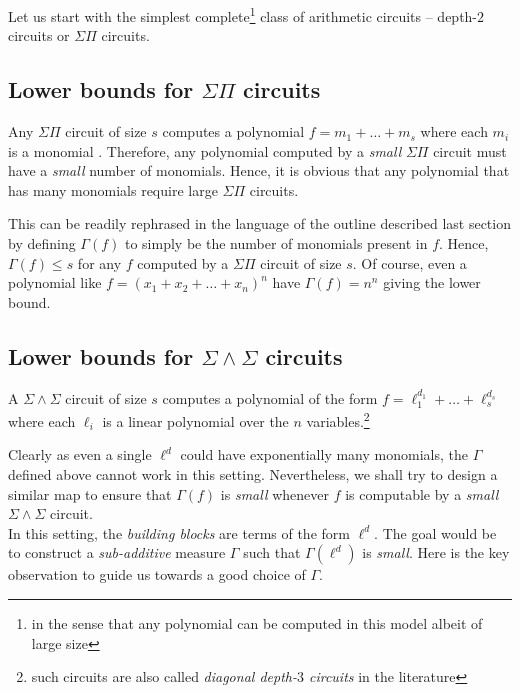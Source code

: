 \documentclass{birkjour}
\providecommand{\DIFaddtex}[1]{{\protect\color{blue}\uwave{#1}}} %
\providecommand{\DIFdeltex}[1]{{\protect\color{red}\sout{#1}}}                      %
\providecommand{\DIFaddbegin}{} %
\providecommand{\DIFaddend}{} %
\providecommand{\DIFdelbegin}{} %
\providecommand{\DIFdelend}{} %
\providecommand{\DIFadd}[1]{\texorpdfstring{\DIFaddtex{#1}}{#1}} %
\providecommand{\DIFdel}[1]{\texorpdfstring{\DIFdeltex{#1}}{}} %
\begin{document}
Let us start with the simplest complete\footnote{in the sense that any polynomial can be computed in this model albeit of large size}  class of arithmetic circuits -- depth-$2$ circuits or $\Sigma\Pi$ circuits. 

\subsection{Lower bounds for $\Sigma\Pi$ circuits}

Any $\Sigma\Pi$ circuit of size $s$ computes a polynomial $f = m_1 + \dots + m_s$ where each $m_i$ is a monomial \DIFaddbegin \DIFadd{multiplied by a field constant}\DIFaddend . Therefore, any polynomial computed by a \emph{small} $\Sigma\Pi$ circuit must have a \emph{small} number of monomials. Hence, it is obvious that any polynomial that has many monomials require large $\Sigma\Pi$ circuits. 

This can be readily rephrased in the language of the outline described last section by defining $\Gamma(f)$ to simply be the number of monomials present in $f$. Hence, $\Gamma(f)\leq s$ for any $f$ computed by a $\Sigma\Pi$ circuit of size $s$. Of course, even a polynomial like $f = (x_1 + x_2+\dots + x_n)^n$  have \DIFdelbegin \DIFdel{$\Gamma(f) = n^n$ }\DIFdelend \DIFaddbegin \DIFadd{$\Gamma(f) = n^{\Omega(n)}$ }\DIFaddend giving the lower bound. 

\subsection{Lower bounds for $\Sigma\!\wedge\!\Sigma$ circuits}

A $\Sigma\!\wedge\!\Sigma$ circuit of size $s$ computes a polynomial of the form $f = \ell_1^{d_1} + \dots + \ell_s^{d_s}$ where each $\ell_i$ is a linear polynomial over the $n$ variables.\footnote{such circuits are also called \emph{diagonal depth-$3$ circuits} in the literature}

Clearly as even a single $\ell^d$ could have exponentially many monomials, the $\Gamma$ defined above cannot work in this setting. Nevertheless, we shall try to design a similar map to ensure that $\Gamma(f)$ is \emph{small} whenever $f$ is computable by a \emph{small} $\Sigma\!\wedge\!\Sigma$ circuit. \\

In this setting, the \emph{building blocks} are terms of the form $\ell^d$. The goal would be to construct a \emph{sub-additive} measure $\Gamma$ such that $\Gamma(\ell^d)$ is \emph{small}. Here is the key observation to guide us towards a good choice of $\Gamma$. 
\end{document}
